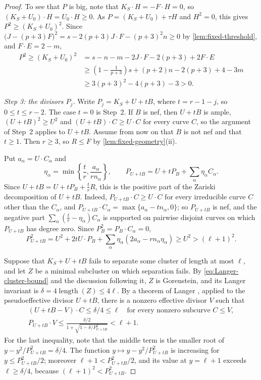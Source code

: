 \documentclass[11pt,reqno]{amsart}
\numberwithin{equation}{section}
\theoremstyle{remark}
\begin{document}
\begin{proof}
To see that \(P\) is big, note that \(K_S\cdot H=-F\cdot H=0\), so \((K_S+U_0)\cdot H=U_0\cdot H\geq0\). As \(P=(K_S+U_0)+\tau H\) and \(H^2=0\), this gives \(P^2\geq(K_S+U_0)^2\). Since \(\bigl(J-(p+3)F\bigr)^2=s-2(p+3)J\cdot F-(p+3)^2n\geq0\) by \cref{lem:fixed-threshold}, and \(F\cdot E=2-m\),
\begin{align*}
 P^2\geq(K_S+U_0)^2&=s-n-m-2J\cdot F-2(p+3)+2F\cdot E\\
 &\geq\left(1-\frac1{p+3}\right)s+(p+2)n-2(p+3)+4-3m\\
 &\geq3(p+3)^2-4(p+3)-3>0.
\end{align*}

\smallskip\noindent\emph{Step 3: the divisors \(P_j\).} Write \(P_j=K_S+U+tB\), where \(t=r-1-j\), so \(0\leq t\leq r-2\). The case \(t=0\) is Step~2. If \(B\) is nef, then \(U+tB\) is ample, \((U+tB)^2\geq U^2\) and \((U+tB)\cdot C\geq U\cdot C\) for every curve \(C\), so the argument of Step~2 applies to \(U+tB\). Assume from now on that \(B\) is not nef and that \(t\geq1\). Then \(r\geq3\), so \(R\leq F\) by \cref{lem:fixed-geometry}\textup{(ii)}.

Put \(a_\alpha=U\cdot C_\alpha\) and
\[
 \eta_\alpha=\min\left\{\frac tr,\frac{a_\alpha}{rn_\alpha}\right\},
 \qquad
 P_{U+tB}=U+tP_B+\sum_\alpha\eta_\alpha C_\alpha.
\]
Since \(U+tB=U+tP_B+\frac trR\), this is the positive part of the Zariski decomposition of \(U+tB\). Indeed, \(P_{U+tB}\cdot C\geq U\cdot C\) for every irreducible curve \(C\) other than the \(C_\alpha\), and \(P_{U+tB}\cdot C_\alpha=\max\{a_\alpha-tn_\alpha,0\}\); so \(P_{U+tB}\) is nef, and the negative part \(\sum_\alpha(\frac tr-\eta_\alpha)C_\alpha\) is supported on pairwise disjoint curves on which \(P_{U+tB}\) has degree zero. Since \(P_B^2=P_B\cdot C_\alpha=0\),
\begin{equation*}
 P_{U+tB}^2=U^2+2tU\cdot P_B+
   \sum_\alpha\eta_\alpha(2a_\alpha-rn_\alpha\eta_\alpha)
   \geq U^2>(\ell+1)^2.
\end{equation*}

Suppose that \(K_S+U+tB\) fails to separate some cluster of length at most \(\ell\), and let \(Z\) be a minimal subcluster on which separation fails. By \eqref{eq:Langer-cluster-bound} and the discussion following it, \(Z\) is Gorenstein, and its Langer invariant is \(\delta=4\operatorname{length}(Z)\leq4\ell\). By a theorem of Langer \cite[Theorem~0.1]{Langer}, applied to the pseudoeffective divisor \(U+tB\), there is a nonzero effective divisor \(V\) such that
\begin{equation}\label{eq:fixed-Langer-obstruction}
 \begin{gathered}
 (U+tB-V)\cdot C\leq\delta/4\leq\ell
       \quad\text{for every nonzero subcurve }C\leq V,\\
 P_{U+tB}\cdot V\leq\frac{\delta/2}{1+\sqrt{1-\delta/P_{U+tB}^2}}<\ell+1.
 \end{gathered}
\end{equation}
For the last inequality, note that the middle term is the smaller root of \(y-y^2/P_{U+tB}^2=\delta/4\). The function \(y\mapsto y-y^2/P_{U+tB}^2\) is increasing for \(y\leq P_{U+tB}^2/2\); moreover \(\ell+1<P_{U+tB}^2/2\), and its value at \(y=\ell+1\) exceeds \(\ell\geq\delta/4\), because \((\ell+1)^2<P_{U+tB}^2\).


\end{proof}
\end{document}
